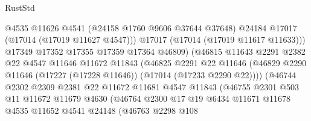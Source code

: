 \begin{lexlean}{RustStd}
\begin{coremodule}
{\begin{coremodule}
{{{{{{{{{{{{{{{{{{{{{{{{{{{{{{{{{{{{{{{{{{{{{{{{{{{{{{{                                  @4535
                                  @11626
                                  @4541
                                  (@24158 @1760 @9606 @37644 @37648)
                                  @24184
                                  @17017
                                  (@17014 (@17019 @11627 @4547)))
                                @17017
                                (@17014 (@17019 @11617 @11633)))
                              @17349
                              @17352
                              @17355
                              @17359
                              @17364
                              @46809)
                            (@46815
                              @11643
                              @2291
                              @2382
                              @22
                              @4547
                              @11646
                              @11672
                              @11843
                              (@46825
                                @2291
                                @22
                                @11646
                                (@46829
                                  @2290
                                  @11646
                                  (@17227 (@17228 @11646))
                                  (@17014 (@17233 @2290 @22))))
                              (@46744
                                @2302
                                @2309
                                @2381
                                @22
                                @11672
                                @11681
                                @4547
                                @11843
                                (@46755
                                  @2301
                                  @503
                                  @11
                                  @11672
                                  @11679
                                  @4630
                                  (@46764
                                    @2300
                                    @17
                                    @19
                                    @6434
                                    @11671
                                    @11678
                                    @4535
                                    @11652
                                    @4541
                                    @24148
                                    (@46763
                                      @2298
                                      @108
}}}}}}}}}}}}}}}}}}}}}}}}}}}}}}}}}}}}}}}}}}}}}}}}}}}}}}}
\end{coremodule}}
\end{coremodule}
\end{lexlean}
